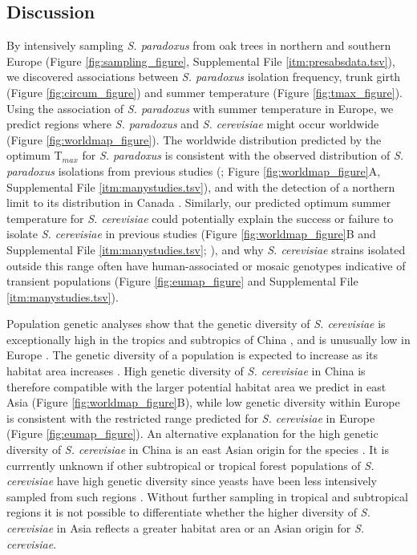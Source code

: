 \documentclass[12pt]{article}
\begin{document}
\begin{linenumbers}
\clearpage

\section*{Discussion}

By intensively sampling \textit{S. paradoxus} from oak trees in northern and southern Europe (Figure \ref{fig:sampling_figure}, Supplemental File \ref{itm:presabsdata.tsv}), we discovered associations between \textit{S. paradoxus} isolation frequency, trunk girth (Figure \ref{fig:circum_figure}) and summer temperature (Figure \ref{fig:tmax_figure}). Using the association of \textit{S. paradoxus} with summer temperature in Europe, we predict regions where \textit{S. paradoxus} and \textit{S. cerevisiae} might occur worldwide (Figure \ref{fig:worldmap_figure}). The worldwide distribution predicted by the optimum T$_{max}$ for \textit{S. paradoxus} is consistent with the observed distribution of \textit{S. paradoxus} isolations from previous studies (\citealp{boynton_ecology_2014}; Figure \ref{fig:worldmap_figure}A, Supplemental File \ref{itm:manystudies.tsv}), and with the detection of a northern limit to its distribution in Canada \citep{charron_exploring_2014}. Similarly, our predicted optimum summer temperature for \textit{S. cerevisiae} could potentially explain the success or failure to isolate \textit{S. cerevisiae} in previous studies (Figure \ref{fig:worldmap_figure}B and Supplemental File \ref{itm:manystudies.tsv}; \citealp{johnson_population_2004,charron_exploring_2014,kowallik_interaction_2015}), and why \textit{S. cerevisiae} strains isolated outside this range often have human-associated or mosaic genotypes indicative of transient populations (Figure \ref{fig:eumap_figure} and Supplemental File \ref{itm:manystudies.tsv}). 

Population genetic analyses show that the genetic diversity of \textit{S. cerevisiae} is exceptionally high in the tropics and subtropics of China \citep{wang_surprisingly_2012,almeida_population_2015}, and is unusually low in Europe \citep{almeida_population_2015}. The genetic diversity of a population is expected to increase as its habitat area increases \citep{rauch_estimating_2005}. High genetic diversity of \textit{S. cerevisiae} in China is therefore compatible with the larger potential habitat area we predict in east Asia (Figure \ref{fig:worldmap_figure}B), while low genetic diversity within Europe is consistent with the restricted range predicted for \textit{S. cerevisiae} in Europe (Figure \ref{fig:eumap_figure}). An alternative explanation for the high genetic diversity of \textit{S. cerevisiae} in China is an east Asian origin for the species \citep{wang_surprisingly_2012,almeida_population_2015}. It is currrently unknown if other subtropical or tropical forest populations of \textit{S. cerevisiae} have high genetic diversity since yeasts have been less intensively sampled from such regions \citep{robert_yeast_2006,kurtzman_advances_2015}. Without further sampling in tropical and subtropical regions it is not possible to differentiate whether the higher diversity of \textit{S. cerevisiae} in Asia reflects a greater habitat area or an Asian origin for \textit{S. cerevisiae}.


\end{linenumbers}
\end{document}
